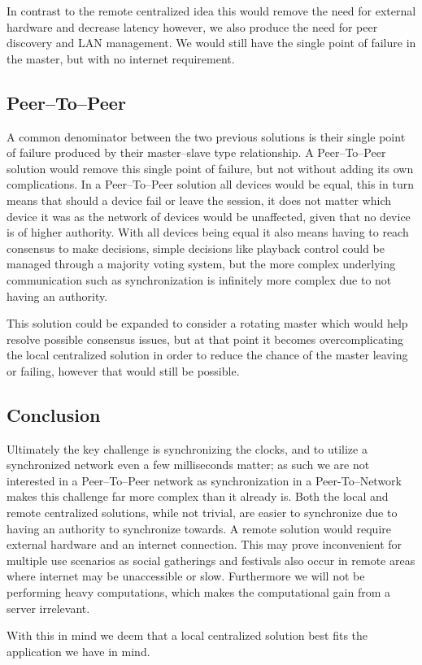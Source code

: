 In contrast to the remote centralized idea this would remove the need for external hardware and decrease latency however, we also produce the need for peer discovery and LAN management.
We would still have the single point of failure in the master, but with no internet requirement.

\subsection{Peer--To--Peer}
A common denominator between the two previous solutions is their single point of failure produced by their master--slave type relationship.
A Peer--To--Peer solution would remove this single point of failure, but not without adding its own complications.
In a Peer--To--Peer solution all devices would be equal, this in turn means that should a device fail or leave the session, it does not matter which device it was as the network of devices would be unaffected, given that no device is of higher authority.
With all devices being equal it also means having to reach consensus to make decisions, simple decisions like playback control could be managed through a majority voting system, but the more complex underlying communication such as synchronization is infinitely more complex due to not having an authority.

This solution could be expanded to consider a rotating master which would help resolve possible consensus issues, but at that point it becomes overcomplicating the local centralized solution in order to reduce the chance of the master leaving or failing, however that would still be possible.


\subsection{Conclusion}
Ultimately the key challenge is synchronizing the clocks, and to utilize a synchronized network even a few milliseconds matter; as such we are not interested in a Peer--To--Peer network as synchronization in a Peer-To--Network makes this challenge far more complex than it already is.
Both the local and remote centralized solutions, while not trivial, are easier to synchronize due to having an authority to synchronize towards.
A remote solution would require external hardware and an internet connection.
This may prove inconvenient for multiple use scenarios as social gatherings and festivals also occur in remote areas where internet may be unaccessible or slow. 
Furthermore we will not be performing heavy computations, which makes the computational gain from a server irrelevant.

With this in mind we deem that a local centralized solution best fits the application we have in mind. 
